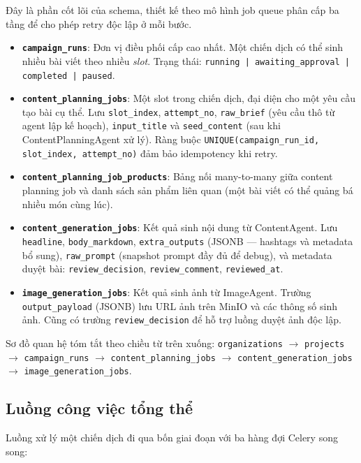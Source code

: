 Đây là phần cốt lõi của schema, thiết kế theo mô hình job queue phân cấp
ba tầng để cho phép retry độc lập ở mỗi bước.

\begin{itemize}
  \item \textbf{\texttt{campaign\_runs}}: Đơn vị điều phối cấp cao nhất.
    Một chiến dịch có thể sinh nhiều bài viết theo nhiều
    \emph{slot}. Trạng thái: \texttt{running | awaiting\_approval |
    completed | paused}.
  \item \textbf{\texttt{content\_planning\_jobs}}: Một slot trong chiến
    dịch, đại diện cho một yêu cầu tạo bài cụ thể. Lưu
    \texttt{slot\_index}, \texttt{attempt\_no}, \texttt{raw\_brief}
    (yêu cầu thô từ agent lập kế hoạch), \texttt{input\_title} và
    \texttt{seed\_content} (sau khi ContentPlanningAgent xử lý). Ràng
    buộc \texttt{UNIQUE(campaign\_run\_id, slot\_index, attempt\_no)}
    đảm bảo idempotency khi retry.
  \item \textbf{\texttt{content\_planning\_job\_products}}: Bảng nối
    many-to-many giữa content planning job và danh sách sản phẩm liên
    quan (một bài viết có thể quảng bá nhiều món cùng lúc).
  \item \textbf{\texttt{content\_generation\_jobs}}: Kết quả sinh nội
    dung từ ContentAgent. Lưu \texttt{headline}, \texttt{body\_markdown},
    \texttt{extra\_outputs} (JSONB --- hashtags và metadata bổ sung),
    \texttt{raw\_prompt} (snapshot prompt đầy đủ để debug), và metadata
    duyệt bài: \texttt{review\_decision}, \texttt{review\_comment},
    \texttt{reviewed\_at}.
  \item \textbf{\texttt{image\_generation\_jobs}}: Kết quả sinh ảnh từ
    ImageAgent. Trường \texttt{output\_payload} (JSONB) lưu URL ảnh
    trên MinIO và các thông số sinh ảnh. Cũng có trường
    \texttt{review\_decision} để hỗ trợ luồng duyệt ảnh độc lập.
\end{itemize}

Sơ đồ quan hệ tóm tắt theo chiều từ trên xuống:
\texttt{organizations} $\to$ \texttt{projects} $\to$
\texttt{campaign\_runs} $\to$ \texttt{content\_planning\_jobs} $\to$
\texttt{content\_generation\_jobs} $\to$
\texttt{image\_generation\_jobs}.

\subsection{Luồng công việc tổng thể}

Luồng xử lý một chiến dịch đi qua bốn giai đoạn với ba hàng đợi Celery
song song:

